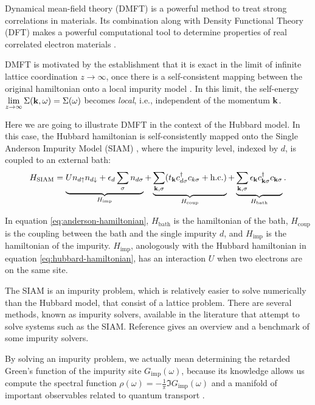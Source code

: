 \documentclass[12pt]{report}
\begin{document}
Dynamical mean-field theory (DMFT) is a powerful method to treat strong correlations in materials. Its combination along with Density Functional Theory (DFT) makes a powerful computational tool to determine properties of real correlated electron materials \cite{hauleweb, haule_real_materials}.

DMFT is motivated by the establishment that it is exact in the limit of infinite lattice coordination $z \to \infty$, once there is a self-consistent mapping between the original hamiltonian onto a local impurity model \cite{thesis_dmft_graz}. In this limit, the self-energy $\displaystyle{\lim_{z \to \infty}\Sigma({\vb{k}},\omega) = \Sigma(\omega)}$ becomes \textit{local}, i.e., independent of the momentum ${\vb{k}}$.

Here we are going to illustrate DMFT in the context of the Hubbard model. In this case, the Hubbard hamiltonian is self-consistently mapped onto the Single Anderson Impurity Model (SIAM) \cite{impurity-solvers, georges1996}, where the impurity level, indexed by $d$, is coupled to an external bath:
\begin{equation} \label{eq:anderson-hamiltonian}
H_{\text{SIAM}} = \underbrace{U n_{d{\uparrow}} n_{d{\downarrow}} + \epsilon_d \sum_{{\sigma}} n_{d{\sigma}}}_{H_{\text{imp}}}
+ \underbrace{\sum_{{\vb{k}},{\sigma}} (t_{\vb{k}} c_{d{\sigma}}^\dagger c_{k{\sigma}} + {\text{h.c.}})}_{H_{\text{coup}}}
+ \underbrace{\sum_{{\vb{k}},{\sigma}} \epsilon_{\vb{k}} c_{{\vb{k}}{\sigma}}^\dagger c_{{\vb{k}}{\sigma}}}_{H_{\text{bath}}}.
\end{equation}

In equation \ref{eq:anderson-hamiltonian}, $H_{\text{bath}}$ is the hamiltonian of the bath, $H_{\text{coup}}$ is the coupling between the bath and the single impurity $d$, and $H_{\text{imp}}$ is the hamiltonian of the impurity. $H_{\text{imp}}$, anologously with the Hubbard hamiltonian in equation \ref{eq:hubbard-hamiltonian}, has an interaction $U$ when two electrons are on the same site.

The SIAM is an impurity problem, which is relatively easier to solve numerically than the Hubbard model, that consist of a lattice problem. There are several methods, known as impurity solvers, available in the literature that attempt to solve systems such as the SIAM. Reference \cite{impurity-solvers} gives an overview and a benchmark of some impurity solvers.

By solving an impurity problem, we actually mean determining the retarded Green's function of the impurity site $G_{\text{imp}}(\omega)$, because its knowledge allows us compute the spectral function $\displaystyle{\rho(\omega) = - \frac{1}{\pi} \Im{G_{\text{imp}}(\omega)}}$ \cite{bruus} and a manifold of important observables related to quantum transport \cite{pedagogical-gfs}.
\end{document}
